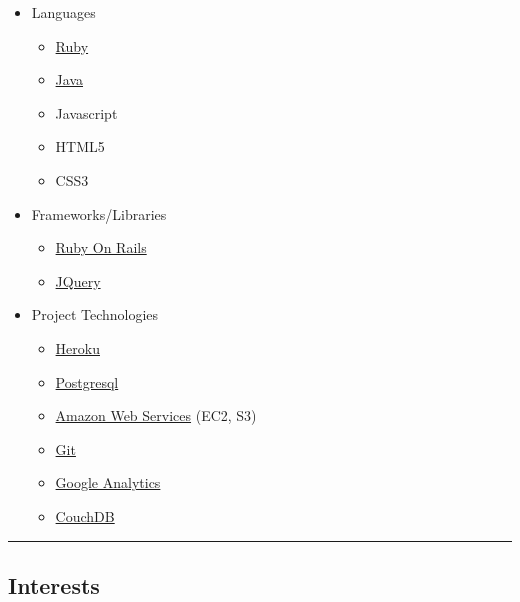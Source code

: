 \documentclass{article}
\begin{document}
\begin{itemize}%
\item Languages

\begin{itemize}%
\item \href{http://www.ruby-lang.org/en/}{Ruby}
\item \href{http://www.java.com/en/}{Java}
\item Javascript
\item HTML5
\item CSS3

\end{itemize}


\end{itemize}
\begin{itemize}%
\item Frameworks/Libraries

\begin{itemize}%
\item \href{http://rubyonrails.org/}{Ruby On Rails}
\item \href{http://jquery.com/}{JQuery}

\end{itemize}


\end{itemize}
\begin{itemize}%
\item Project Technologies

\begin{itemize}%
\item \href{http://www.heroku.com}{Heroku}
\item \href{http://www.postgresql.org/}{Postgresql}
\item \href{http://aws.amazon.com/}{Amazon Web Services} (EC2, S3)
\item \href{http://git-scm.com/}{Git}
\item \href{http://www.google.com/analytics/}{Google Analytics}
\item \href{http://couchdb.apache.org/}{CouchDB}

\end{itemize}


\end{itemize}

\vspace{.5em} \hrule \vspace{.5em}
\hypertarget{interests}{}\subsection*{{Interests}}\label{interests}
\end{document}
